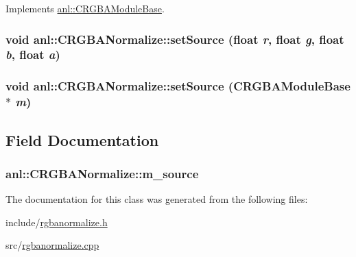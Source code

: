 Implements \hyperlink{classanl_1_1CRGBAModuleBase_afb6896d38ae92b9bb784fe5dc731ae67}{anl::CRGBAModuleBase}.\hypertarget{classanl_1_1CRGBANormalize_a472266f845cd7da7a10860e10591c641}{
\subsubsection[{setSource}]{\setlength{\rightskip}{0pt plus 5cm}void anl::CRGBANormalize::setSource (float {\em r}, \/  float {\em g}, \/  float {\em b}, \/  float {\em a})}}
\label{classanl_1_1CRGBANormalize_a472266f845cd7da7a10860e10591c641}
\hypertarget{classanl_1_1CRGBANormalize_aa6de1b704947b49c2351c7a95b9776ba}{
\subsubsection[{setSource}]{\setlength{\rightskip}{0pt plus 5cm}void anl::CRGBANormalize::setSource ({\bf CRGBAModuleBase} $\ast$ {\em m})}}
\label{classanl_1_1CRGBANormalize_aa6de1b704947b49c2351c7a95b9776ba}


\subsection{Field Documentation}
\hypertarget{classanl_1_1CRGBANormalize_a3f4f9066210b59423433c1cf7e53c494}{
\subsubsection[{m\_\-source}]{ {\bf anl::CRGBANormalize::m\_\-source}}}
\label{classanl_1_1CRGBANormalize_a3f4f9066210b59423433c1cf7e53c494}


The documentation for this class was generated from the following files:\begin{DoxyCompactItemize}
\item 
include/\hyperlink{rgbanormalize_8h}{rgbanormalize.h}\item 
src/\hyperlink{rgbanormalize_8cpp}{rgbanormalize.cpp}\end{DoxyCompactItemize}
